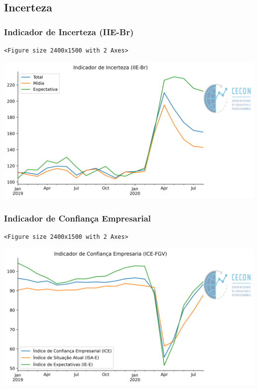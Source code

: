 \documentclass[11pt]{article}
\begin{document}
\subsection{Incerteza}
\label{sec:org8cd0d27}



\subsubsection{Indicador de Incerteza (IIE-Br)}
\label{sec:org261cc29}

\begin{verbatim}
<Figure size 2400x1500 with 2 Axes>
\end{verbatim}


\begin{center}
\includegraphics[width=.9\linewidth]{obipy-resources/62e383af79e91b63c7fc98dd7fb55b3c3ececcb9/c5efa72595cc12bf613b1062622f61c3df58ecab.png}
\end{center}


\subsubsection{Indicador de Confiança Empresarial}
\label{sec:org49b67af}

\begin{verbatim}
<Figure size 2400x1500 with 2 Axes>
\end{verbatim}


\begin{center}
\includegraphics[width=.9\linewidth]{obipy-resources/62e383af79e91b63c7fc98dd7fb55b3c3ececcb9/8e38298178125842685b068036bdce559fd6ab01.png}
\end{center}
\end{document}
